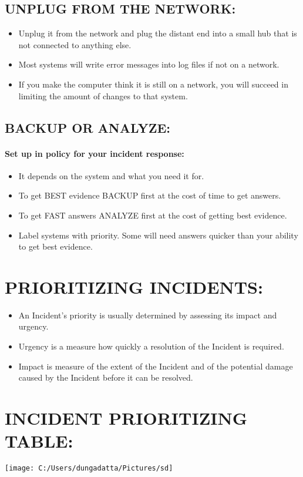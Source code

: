 \documentclass[10pt,british,english]{article}
\begin{document}
\subsection{UNPLUG FROM THE NETWORK:}
\begin{itemize}
\item Unplug it from the network and plug the distant end into a small hub
that is not connected to anything else.
\item Most systems will write error messages into log files if not on a
network. 
\item If you make the computer think it is still on a network, you will
succeed in limiting the amount of changes to that system.
\end{itemize}

\subsection{BACKUP OR ANALYZE:}

\paragraph{Set up in policy for your incident response:}
\begin{itemize}
\item It depends on the system and what you need it for.
\item To get BEST evidence BACKUP first at the cost of time to get answers.
\item To get FAST answers ANALYZE first at the cost of getting best evidence.
\item Label systems with priority. Some will need answers quicker than your
ability to get best evidence.
\end{itemize}
%

\section{PRIORITIZING INCIDENTS:}
\begin{itemize}
\item An Incident's priority is usually determined by assessing its impact
and urgency.
\item Urgency is a measure how quickly a resolution of the Incident is required.
\item Impact is measure of the extent of the Incident and of the potential
damage caused by the Incident before it can be resolved.
\end{itemize}

\section{INCIDENT PRIORITIZING TABLE:}

\texttt{[image: C:/Users/dungadatta/Pictures/sd]}
\end{document}
